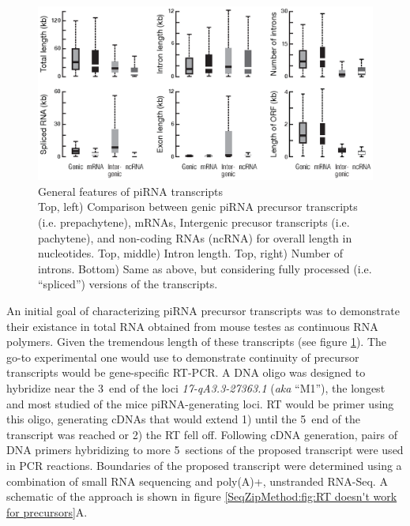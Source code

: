     \begin{figure} %
      \centering 
      \includegraphics{Figures/SeqZipMethod/piRNAPrecusorTXFeatures.eps}
      \caption[General features of piRNA transcripts]
      {
        General features of piRNA transcripts\\[0.25cm]
        Top, left) Comparison between genic piRNA precursor transcripts (i.e. prepachytene), mRNAs, Intergenic precusor transcripts (i.e. pachytene), and non-coding RNAs (ncRNA) for overall length in nucleotides. Top, middle) Intron length. Top, right) Number of introns. Bottom) Same as above, but considering fully processed (i.e. ``spliced'') versions of the transcripts.
        }
      \label{SeqZipMethod:fig:piRNA precusor Tx features}
      \end{figure}

    An initial goal of characterizing piRNA precursor transcripts was to demonstrate their existance in total RNA obtained from mouse testes as continuous RNA polymers. Given the tremendous length of these transcripts (see figure \ref{SeqZipMethod:fig:piRNA precusor Tx features}). The go-to experimental one would use to demonstrate continuity of precursor transcripts would be gene-specific RT-PCR. A DNA oligo was designed to hybridize near the 3\textprime~end of the loci \textit{17-qA3.3-27363.1} (\textit{aka} ``M1''), the longest and most studied of the mice piRNA-generating loci. RT would be primer using this oligo, generating cDNAs that would extend 1) until the 5\textprime~end of the transcript was reached or 2) the RT fell off. Following cDNA generation, pairs of DNA primers hybridizing to more 5\textprime~sections of the proposed transcript were used in PCR reactions. Boundaries of the proposed transcript were determined using a combination of small RNA sequencing and poly(A)+, unstranded RNA-Seq. A schematic of the approach is shown in figure \ref{SeqZipMethod:fig:RT doesn't work for precursors}A.

